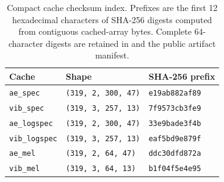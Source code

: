 \begin{table}[htbp]
\centering
\caption{Compact cache checksum index. Prefixes are the first 12 hexadecimal characters of SHA-256 digests computed from contiguous cached-array bytes. Complete 64-character digests are retained in  and the public artifact manifest.}
\label{tab:supp-cache-provenance}
\small
\begin{tabular}{@{}lll@{}}
\toprule
Cache & Shape & SHA-256 prefix \\
\midrule
\texttt{ae\_spec} & \texttt{(319, 2, 300, 47)} & \texttt{e19ab882af89} \\
\texttt{vib\_spec} & \texttt{(319, 3, 257, 13)} & \texttt{7f9573cb3fe9} \\
\texttt{ae\_logspec} & \texttt{(319, 2, 300, 47)} & \texttt{33e9bade3f4b} \\
\texttt{vib\_logspec} & \texttt{(319, 3, 257, 13)} & \texttt{eaf5bd9e879f} \\
\texttt{ae\_mel} & \texttt{(319, 2, 64, 47)} & \texttt{ddc30dfd872a} \\
\texttt{vib\_mel} & \texttt{(319, 3, 64, 13)} & \texttt{b1f04f5e4e95} \\
\bottomrule
\end{tabular}
\end{table}
